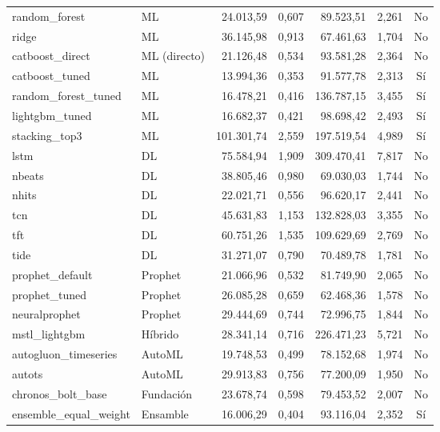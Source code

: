 \begin{longtable}{llrrrrc}
    random\_forest & ML & 24.013,59 & 0,607 & 89.523,51 & 2,261 & No \\
    ridge & ML & 36.145,98 & 0,913 & 67.461,63 & 1,704 & No \\
    catboost\_direct & ML (directo) & 21.126,48 & 0,534 & 93.581,28 & 2,364 & No \\
    catboost\_tuned & ML & 13.994,36 & 0,353 & 91.577,78 & 2,313 & Sí \\
    random\_forest\_tuned & ML & 16.478,21 & 0,416 & 136.787,15 & 3,455 & Sí \\
    lightgbm\_tuned & ML & 16.682,37 & 0,421 & 98.698,42 & 2,493 & Sí \\
    stacking\_top3 & ML & 101.301,74 & 2,559 & 197.519,54 & 4,989 & Sí \\
    lstm & DL & 75.584,94 & 1,909 & 309.470,41 & 7,817 & No \\
    nbeats & DL & 38.805,46 & 0,980 & 69.030,03 & 1,744 & No \\
    nhits & DL & 22.021,71 & 0,556 & 96.620,17 & 2,441 & No \\
    tcn & DL & 45.631,83 & 1,153 & 132.828,03 & 3,355 & No \\
    tft & DL & 60.751,26 & 1,535 & 109.629,69 & 2,769 & No \\
    tide & DL & 31.271,07 & 0,790 & 70.489,78 & 1,781 & No \\
    prophet\_default & Prophet & 21.066,96 & 0,532 & 81.749,90 & 2,065 & No \\
    prophet\_tuned & Prophet & 26.085,28 & 0,659 & 62.468,36 & 1,578 & No \\
    neuralprophet & Prophet & 29.444,69 & 0,744 & 72.996,75 & 1,844 & No \\
    mstl\_lightgbm & Híbrido & 28.341,14 & 0,716 & 226.471,23 & 5,721 & No \\
    autogluon\_timeseries & AutoML & 19.748,53 & 0,499 & 78.152,68 & 1,974 & No \\
    autots & AutoML & 29.913,83 & 0,756 & 77.200,09 & 1,950 & No \\
    chronos\_bolt\_base & Fundación & 23.678,74 & 0,598 & 79.453,52 & 2,007 & No \\
    ensemble\_equal\_weight & Ensamble & 16.006,29 & 0,404 & 93.116,04 & 2,352 & Sí \\
\end{longtable}
\endgroup

